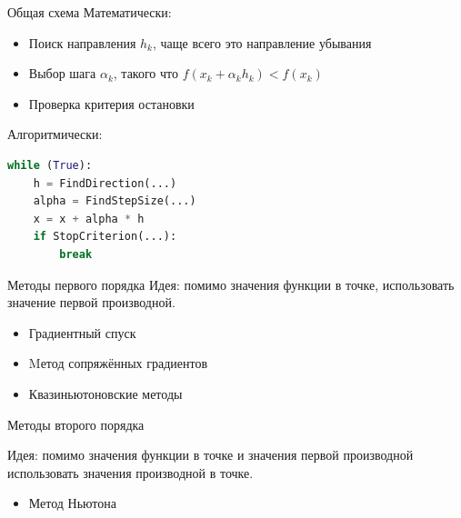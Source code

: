 \documentclass[12pt]{beamer}
\begin{document}
\begin{frame}[fragile]{Общая схема}
Математически:
\begin{itemize}
\item Поиск направления $h_k$, чаще всего это направление убывания
\item Выбор шага $\alpha_k$, такого что $f(x_k + \alpha_k h_k) < f(x_k)$
\item Проверка критерия остановки
\end{itemize}

Алгоритмически:
\begin{lstlisting}[language=Python]
while (True):
    h = FindDirection(...)
    alpha = FindStepSize(...)
    x = x + alpha * h
    if StopCriterion(...):
    	break
\end{lstlisting}

\end{frame}

\begin{frame}{Методы первого порядка}
Идея: помимо значения функции в точке, использовать значение первой производной.

\begin{itemize}
\item Градиентный спуск
\item Mетод сопряжённых градиентов
\item Квазиньютоновские методы
\end{itemize}

\end{frame}

\begin{frame}{Методы второго порядка}

Идея: помимо значения функции в точке и значения первой производной использовать значения {\color{red}{второй}} производной в точке.

\begin{itemize}
\item Метод Ньютона
\end{itemize}

\end{frame}
\end{document}
